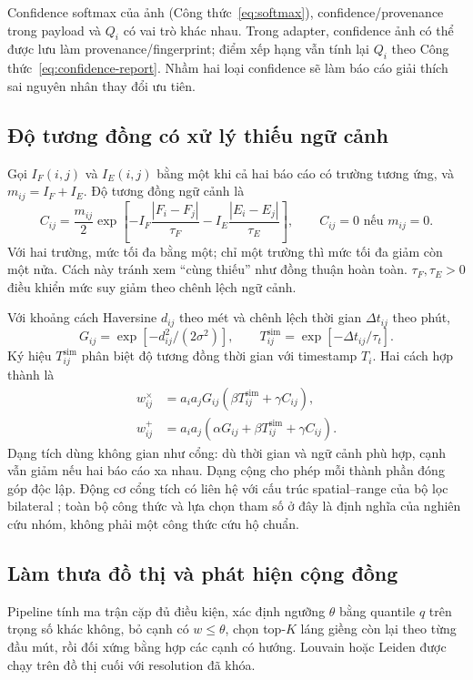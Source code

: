 Confidence softmax của ảnh (Công thức~\ref{eq:softmax}), confidence/provenance trong payload và $Q_i$ có vai trò khác nhau. Trong adapter, confidence ảnh có thể được lưu làm provenance/fingerprint; điểm xếp hạng vẫn tính lại $Q_i$ theo Công thức~\ref{eq:confidence-report}. Nhầm hai loại confidence sẽ làm báo cáo giải thích sai nguyên nhân thay đổi ưu tiên.

\subsection{Độ tương đồng có xử lý thiếu ngữ cảnh}
Gọi $I_F(i,j)$ và $I_E(i,j)$ bằng một khi cả hai báo cáo có trường tương ứng, và $m_{ij}=I_F+I_E$. Độ tương đồng ngữ cảnh là
\begin{equation}
 C_{ij}=\frac{m_{ij}}{2}\exp\!\left[-I_F\frac{|F_i-F_j|}{\tau_F}
                                  -I_E\frac{|E_i-E_j|}{\tau_E}\right],
 \qquad C_{ij}=0\text{ nếu }m_{ij}=0.
 \label{eq:context-report}
\end{equation}
Với hai trường, mức tối đa bằng một; chỉ một trường thì mức tối đa giảm còn một nửa. Cách này tránh xem ``cùng thiếu'' như đồng thuận hoàn toàn. $\tau_F,\tau_E>0$ điều khiển mức suy giảm theo chênh lệch ngữ cảnh.

Với khoảng cách Haversine $d_{ij}$ theo mét và chênh lệch thời gian $\Delta t_{ij}$ theo phút,
\begin{equation}
 G_{ij}=\exp[-d_{ij}^{2}/(2\sigma^2)],\qquad
 T_{ij}^{\mathrm{sim}}=\exp[-\Delta t_{ij}/\tau_t].
 \label{eq:geo-time}
\end{equation}
Ký hiệu $T_{ij}^{\mathrm{sim}}$ phân biệt độ tương đồng thời gian với timestamp $T_i$. Hai cách hợp thành là
\begin{align}
 w_{ij}^{\times}&=a_ia_jG_{ij}(\beta T_{ij}^{\mathrm{sim}}+\gamma C_{ij}),\label{eq:product-graph}\\
 w_{ij}^{+}&=a_ia_j(\alpha G_{ij}+\beta T_{ij}^{\mathrm{sim}}+\gamma C_{ij}).\label{eq:additive-graph}
\end{align}
Dạng tích dùng không gian như cổng: dù thời gian và ngữ cảnh phù hợp, cạnh vẫn giảm nếu hai báo cáo xa nhau. Dạng cộng cho phép mỗi thành phần đóng góp độc lập. Động cơ cổng tích có liên hệ với cấu trúc spatial--range của bộ lọc bilateral \citep{tomasi1998bilateral}; toàn bộ công thức và lựa chọn tham số ở đây là định nghĩa của nghiên cứu nhóm, không phải một công thức cứu hộ chuẩn.

\subsection{Làm thưa đồ thị và phát hiện cộng đồng}
Pipeline tính ma trận cặp đủ điều kiện, xác định ngưỡng $\theta$ bằng quantile $q$ trên trọng số khác không, bỏ cạnh có $w\leq\theta$, chọn top-$K$ láng giềng còn lại theo từng đầu mút, rồi đối xứng bằng hợp các cạnh có hướng. Louvain hoặc Leiden được chạy trên đồ thị cuối với resolution đã khóa.

